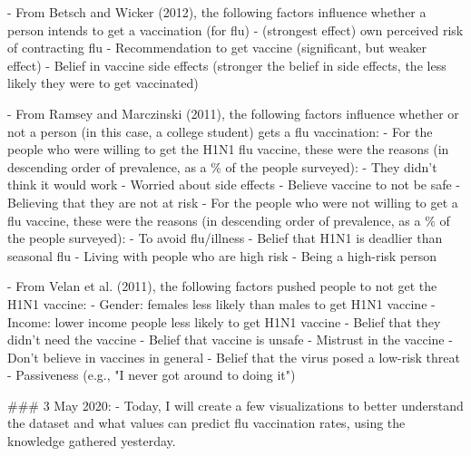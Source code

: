 		- From Betsch and Wicker (2012), the following factors influence whether a person intends
		to get a vaccination (for flu)
			- (strongest effect) own perceived risk of contracting flu
			- Recommendation to get vaccine (significant, but weaker effect)
			- Belief in vaccine side effects (stronger the belief in side effects, the less likely they were 
			to get vaccinated)
			
		- From Ramsey and Marczinski (2011), the following factors influence whether or not a
		person (in this case, a college student) gets a flu vaccination:
			- For the people who were willing to get the H1N1 flu vaccine, these were the reasons 
			(in descending order of prevalence, as a \% of the people surveyed):
				- They didn't think it would work
				- Worried about side effects
				- Believe vaccine to not be safe
				- Believing that they are not at risk
			- For the people who were not willing to get a flu vaccine, these were the reasons
			(in descending order of prevalence, as a \% of the people surveyed):
				- To avoid flu/illness
				- Belief that H1N1 is deadlier than seasonal flu
				- Living with people who are high risk
				- Being a high-risk person
				
		- From Velan et al. (2011), the following factors pushed people to not get the H1N1 vaccine:
				- Gender: females less likely than males to get H1N1 vaccine
				- Income: lower income people less likely to get H1N1 vaccine
				- Belief that they didn't need the vaccine
				- Belief that vaccine is unsafe
				- Mistrust in the vaccine
				- Don't believe in vaccines in general
				- Belief that the virus posed a low-risk threat
				- Passiveness (e.g., "I never got around to doing it")
				
### 3 May 2020:
	- Today, I will create a few visualizations to better understand the dataset and what values can predict flu vaccination rates, using the knowledge gathered yesterday.
				
	
	